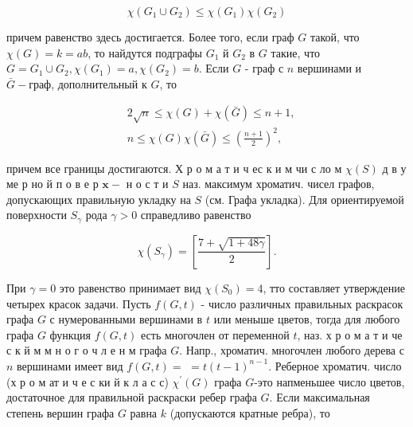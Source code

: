 \documentclass[10pt]{article}
\begin{document}
\[

\chi\left(G_{1} \cup G_{2}\right) \leqslant \chi\left(G_{1}\right) \chi\left(G_{2}\right)

\]



причем равенство здесь достигается. Более того, если граф $G$ такой, что $\chi(G)=k=a b$, то найдутся подграфы $G_{1}$ й $G_{2}$ в $G$ такие, что $G=G_{1} \cup G_{2}, \chi\left(G_{1}\right)=a, \chi\left(G_{2}\right)=b$. Если $G$ - граф с $n$ вершинами и $\bar{G}-г р а ф$, дополнительный к $G$, то



\[

\begin{aligned}

& 2 \sqrt{n} \leqslant \chi(G)+\chi(\bar{G}) \leqslant n+1, \\

& n \leqslant \chi(G) \chi(\bar{G}) \leqslant\left(\frac{n+1}{2}\right)^{2},

\end{aligned}

\]



причем все границы достигаются. Х р о м а т и ч ес к и м чи с ло м $\chi(S)$ д в у ме р но й п о в е р $\mathbf{x}-$ н о с т и $S$ наз. максимум хроматич. чисел графов, допускающих правильную укладку на $S$ (см. Графа укладка). Для ориентируемой поверхности $S_{\gamma}$ рода $\gamma>0$ справедливо равенство



\[

\chi\left(S_{\gamma}\right)=\left[\frac{7+\sqrt{1+48 \gamma}}{2}\right] .

\]



При $\gamma=0$ это равенство принимает вид $\chi\left(S_{0}\right)=4$, тто составляет утверждение четырех красок задачи. Пусть $f(G, t)$ - число различных правильных раскрасок графа $G$ с нумерованными вершинами в $t$ или меныше цветов, тогда для любого графа $G$ функция $f(G, t)$ есть многочлен от переменной $t$, наз. х р о м а т и че с к й м м н о г о ч л е н м графа $G$. Напр., хроматич. многочлен любого дерева с $n$ вершинами имеет вид $f(G, t)=$ $=t(t-1)^{n-1}$. Реберное хроматич. число (х р о м ат и ч е с ки й к л а с с) $\chi^{\prime}(G)$ графа $G$-это напменьшее число цветов, достаточное для правильной раскраски ребер графа $G$. Если максимальная степень вершин графа $G$ равна $k$ (допускаются кратные ребра), то
\end{document}
